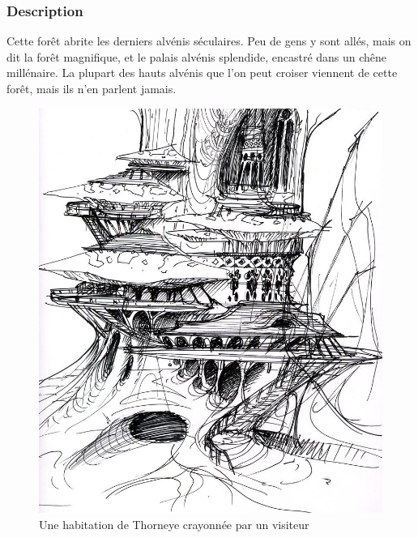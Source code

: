 \subsubsection{Description}
\hypertarget{thorneye}{}Cette forêt abrite les derniers alvénis séculaires.
Peu de gens y sont allés, mais on dit la forêt magnifique, et le palais alvénis splendide, encastré dans un chêne millénaire.
La plupart des hauts alvénis que l'on peut croiser viennent de cette forêt, mais ils n'en parlent jamais.
\begin{figure}[ht]
\begin{center}
\includegraphics[scale=0.25]{./Ressources/medieval/habitation_thorneye.jpg}
\caption{Une habitation de Thorneye crayonnée par un visiteur}
\end{center}
\end{figure}
